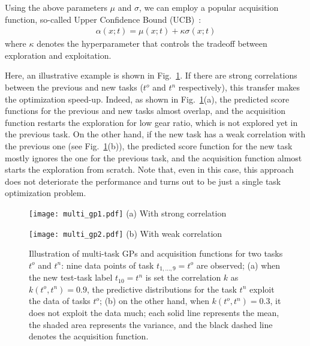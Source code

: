 \documentclass[twocolumn]{svjour3}          %
\begin{document}
Using the above parameters $\mu$ and $\sigma$, we can employ a popular acquisition function, so-called Upper Confidence Bound (UCB)~\cite{srinivas2010gaussian}:
\begin{align}
    \alpha(x; t) = \mu(x; t) + \kappa \sigma(x; t)
    \label{eq:ucb}
\end{align}
where $\kappa$ denotes the hyperparameter that controls the tradeoff between exploration and exploitation.

Here, an illustrative example is shown in Fig.~\ref{fig:multi_gp}.
If there are strong correlations between the previous and new tasks ($t^o$ and $t^n$ respectively), this transfer makes the optimization speed-up.
Indeed, as shown in Fig.~\ref{fig:multi_gp}(a), the predicted score functions for the previous and new tasks almost overlap, and the acquisition function restarts the exploration for low gear ratio, which is not explored yet in the previous task.
On the other hand, if the new task has a weak correlation with the previous one (see Fig.~\ref{fig:multi_gp}(b)), the predicted score function for the new task mostly ignores the one for the previous task, and the acquisition function almost starts the exploration from scratch.
Note that, even in this case, this approach does not deteriorate the performance and turns out to be just a single task optimization problem.

\begin{figure}[tb]
    \centering
    \begin{minipage}{0.49\linewidth}
        \centering
        \texttt{[image: multi\_gp1.pdf]}
        {(a) With strong correlation}
    \end{minipage}
    \begin{minipage}{0.49\linewidth}
        \centering
        \texttt{[image: multi\_gp2.pdf]}
        {(b) With weak correlation}
    \end{minipage}
    \caption{Illustration of multi-task GPs and acquisition functions for two tasks $t^o$ and $t^n$:
nine data points of task $t_{1,\ldots,9} = t^o$ are observed;
(a) when the new test-task label $t_{10} = t^n$ is set the correlation $k$ as $k(t^o,t^n) = 0.9$, the predictive distributions for the task $t^n$ exploit the data of tasks $t^o$;
(b) on the other hand, when $k(t^o,t^n) = 0.3$, it does not exploit the data much;
each solid line represents the mean, the shaded area represents the variance, and the black dashed line denotes the acquisition function.
    }
    \label{fig:multi_gp}
\end{figure}
\end{document}
